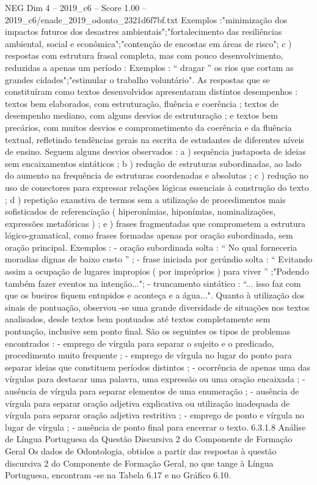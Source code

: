 \begin{textsample}{NEG Dim 4 – 2019\_c6 – Score 1.00 – 2019\_c6/enade\_2019\_odonto\_2321d6f7bf.txt}
Exemplos :"minimização dos impactos futuros dos desastres ambientais";"fortalecimento das resiliências ambiental, social e econômica";"contenção de encostas em áreas de risco"; c ) respostas com estrutura frasal completa, mas com pouco desenvolvimento, reduzidas a apenas um período : Exemplos : “ dragar ” os rios que cortam as grandes cidades";"estimular o trabalho voluntário".
As respostas que se constituíram como textos desenvolvidos apresentaram distintos desempenhos : textos bem elaborados, com estruturação, fluência e coerência ; textos de desempenho mediano, com alguns desvios de estruturação ; e textos bem precários, com muitos desvios e comprometimento da coerência e da fluência textual, refletindo tendências gerais na escrita de estudantes de diferentes níveis de ensino.
Seguem alguns desvios observados : a ) sequência justaposta de ideias sem encaixamentos sintáticos ; b ) redução de estruturas subordinadas, ao lado do aumento na frequência de estruturas coordenadas e absolutas ; c ) redução no uso de conectores para expressar relações lógicas essenciais à construção do texto ; d ) repetição exaustiva de termos sem a utilização de procedimentos mais sofisticados de referenciação ( hiperonímias, hiponímias, nominalizações, expressões metafóricas ) ; e ) frases fragmentadas que comprometem a estrutura lógico-gramatical, como frases formadas apenas por oração subordinada, sem oração principal.
Exemplos : - oração subordinada solta : “ No qual forneceria moradias dignas de baixo custo ” ; - frase iniciada por gerúndio solta : “ Evitando assim a ocupação de lugares impropios ( por impróprios ) para viver ” ;"Podendo também fazer eventos na intenção..."; - truncamento sintático : “... isso faz com que os bueiros fiquem entupidos e aconteça e a água...".
Quanto à utilização dos sinais de pontuação, observou -se uma grande diversidade de situações nos textos analisados, desde textos bem pontuados até textos completamente sem pontuação, inclusive sem ponto final.
São os seguintes os tipos de problemas encontrados : - emprego de vírgula para separar o sujeito e o predicado, procedimento muito frequente ; - emprego de vírgula no lugar do ponto para separar ideias que constituem períodos distintos ; - ocorrência de apenas uma das vírgulas para destacar uma palavra, uma expressão ou uma oração encaixada ; - ausência de vírgula para separar elementos de uma enumeração ; - ausência de vírgula para separar oração adjetiva explicativa ou utilização inadequada de vírgula para separar oração adjetiva restritiva ; - emprego de ponto e vírgula no lugar de vírgula ; - ausência de ponto final para encerrar o texto. 6.3.1.8 Análise de Língua Portuguesa da Questão Discursiva 2 do Componente de Formação Geral Os dados de Odontologia, obtidos a partir das respostas à questão discursiva 2 do Componente de Formação Geral, no que tange à Língua Portuguesa, encontram -se na Tabela 6.17 e no Gráfico 6.10.

\end{textsample}
